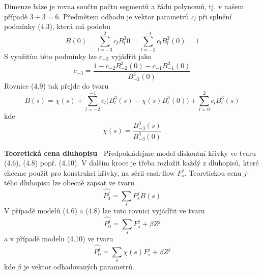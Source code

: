\documentclass[a4paper]{book}
\begin{document}
Dimenze báze je rovna součtu počtu segmentů a řádu polynomů, tj. v našem případě $3 + 3 = 6$. Předmětem odhadu je vektor parametrů $c_l$ při splnění podmínky (4.3), která má podobu
\begin{equation*}
B(0) = \sum_{l = -3}^2 c_l B_l^3{0} = \sum_{l = -3}^{-1} c_l B_l^3(0) = 1
\end{equation*}
S využitím této podmínky lze $c_{-3}$ vyjádřit jako
\begin{equation*}
c_{-3} = \frac{1 - c_{-2}B_{-2}^3(0) - c_{-1}B_{-1}^3(0)}{B_{-3}^3(0)}
\end{equation*}
Rovnice (4.9) tak přejde do tvaru
\begin{equation}
B(s) = \chi(s) + \sum_{l=- 2}^{-1} c_l\Big(B_l^3(s) - \chi(s)B_l^3(0) \Big) + \sum_{l = 0}^2 c_l B_l^3(s)
\end{equation}
kde
\begin{equation*}
\chi(s) = \frac{B_{-3}^3(s)}{B_{-3}^3(0)}
\end{equation*}

\noindent \textbf {Teoretická cena dluhopisu~} Předpokládejme model diskontní křivky ve tvaru (4.6), (4.8) popř. (4.10). V dalším kroce je třeba rozložit každý z dluhopisů, které chceme použít pro konstrukci křivky, na sérii cash-flow $F_s^j$. Teoretickou cenu $j$-tého dluhopisu lze obecně zapsat ve tvaru
\begin{equation*}
\hat{P_0^j} = \sum_s F_s^j B(s)
\end{equation*}
V případě modelů (4.6) a (4.8) lze tuto rovnici vyjádřit ve tvaru
\begin{equation}
\hat{P_0^j} = \sum_s F_s^j + \beta Z^j 
\end{equation}
a v případě modelu (4.10) ve tvaru
\begin{equation}
\hat{P_0^j} = \sum_s \chi(s)F_s^j + \beta Z^j
\end{equation}
kde $\beta$ je vektor odhadovaných parametrů.
\end{document}
